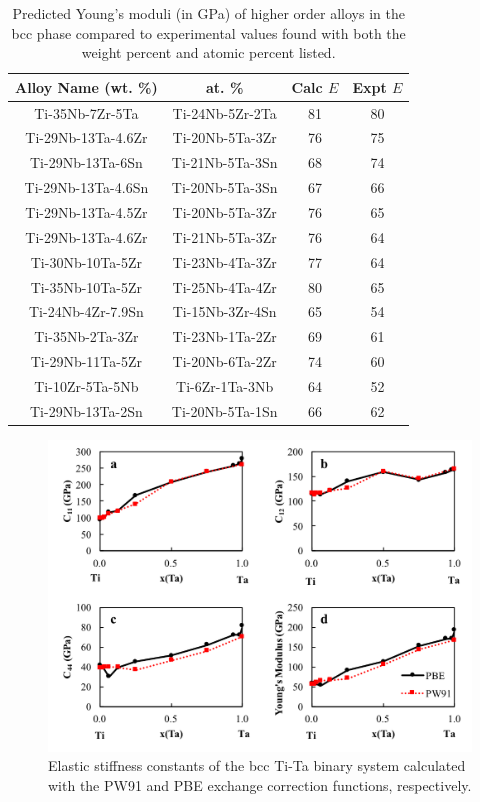\newpage
\begin{table}[H]
	\caption{Predicted Young's moduli (in GPa) of higher order alloys in the bcc phase compared to experimental values found with both the weight percent and atomic percent listed.}
	\centering
	\begin{tabular}{ c c c c }
		\hline
		Alloy Name (wt. \%) & at. \% & Calc $E$ & Expt $E$\\
		\hline
		Ti-35Nb-7Zr-5Ta \cite{Geetha2009} & Ti-24Nb-5Zr-2Ta & 81 & 80\\
		Ti-29Nb-13Ta-4.6Zr \cite{Geetha2009}  & Ti-20Nb-5Ta-3Zr & 76 & 75\\
		Ti-29Nb-13Ta-6Sn \cite{Geetha2009} & Ti-21Nb-5Ta-3Sn & 68 & 74\\
		Ti-29Nb-13Ta-4.6Sn \cite{Geetha2009} & Ti-20Nb-5Ta-3Sn & 67 & 66\\
		Ti-29Nb-13Ta-4.5Zr \cite{Geetha2009} & Ti-20Nb-5Ta-3Zr & 76 & 65\\
		Ti-29Nb-13Ta-4.6Zr \cite{Tane2010a} & Ti-21Nb-5Ta-3Zr & 76 & 64\\
		Ti-30Nb-10Ta-5Zr \cite{Tane2010a} & Ti-23Nb-4Ta-3Zr & 77 & 64\\
		Ti-35Nb-10Ta-5Zr \cite{Tane2010a} & Ti-25Nb-4Ta-4Zr & 80 & 65\\
		Ti-24Nb-4Zr-7.9Sn \cite{Mohammed2014} & Ti-15Nb-3Zr-4Sn & 65 & 54\\
		Ti-35Nb-2Ta-3Zr \cite{Mohammed2014} & Ti-23Nb-1Ta-2Zr & 69 & 61\\
		Ti-29Nb-11Ta-5Zr \cite{Mohammed2014} & Ti-20Nb-6Ta-2Zr & 74 & 60\\
		Ti-10Zr-5Ta-5Nb \cite{Mohammed2014} & Ti-6Zr-1Ta-3Nb & 64 & 52\\
		Ti-29Nb-13Ta-2Sn \cite{Mohammed2014} & Ti-20Nb-5Ta-1Sn & 66 & 62\\
		\hline
	\end{tabular}
	\label{Ch5-table:tixdatacomp}
\end{table}
\clearpage

\pagebreak
\begin{figure}[H]
	\centering
	\includegraphics[width=\textwidth]{Chapter-5/Figures/PBEvsPW91.png}
	\caption{Elastic stiffness constants of the bcc Ti-Ta binary system calculated with the PW91 and PBE exchange correction functions, respectively.}
	\label{Ch5-figure:PBEvsPW91}
\end{figure}

